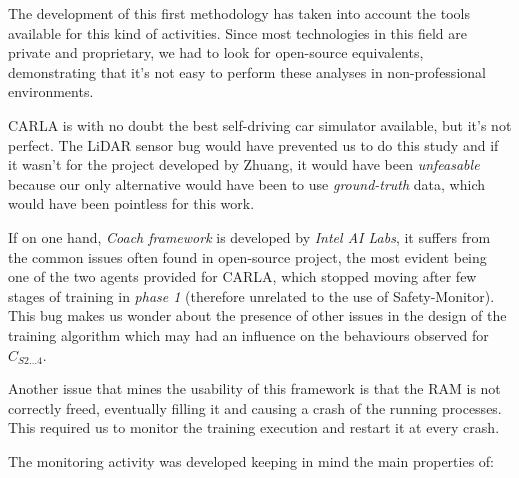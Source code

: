 The development of this first methodology has taken into account the tools available for this kind of activities. Since most technologies in this field are private and proprietary, we had to look for open-source equivalents, demonstrating that it's not easy to perform these analyses in non-professional environments.

CARLA is with no doubt the best self-driving car simulator available, but it's not perfect. The LiDAR sensor bug\cite{lidarbug} would have prevented us to do this study and if it wasn't for the project developed by Zhuang\cite{carlapro}, it would have been \textsl{unfeasable} because our only alternative would have been to use \textsl{ground-truth} data, which would have been pointless for this work.

If on one hand, \textsl{Coach framework} is developed by \textsl{Intel AI Labs}, it suffers from the common issues often found in open-source project, the most evident being one of the two agents provided for CARLA, which stopped moving after few stages of training in \textsl{phase 1} (therefore unrelated to the use of Safety-Monitor).
This bug makes us wonder about the presence of other issues in the design of the training algorithm which may had an influence on the behaviours observed for $C_{S2\dots 4}$.

Another issue that mines the usability of this framework is that the RAM is not correctly freed, eventually filling it and causing a crash of the running processes. This required us to monitor the training execution and restart it at every crash.\newline

The monitoring activity was developed keeping in mind the main properties of:

